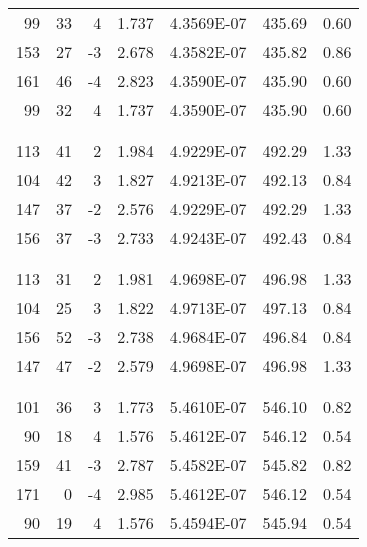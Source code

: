 \documentclass[a4paper,10pt]{article}
\begin{document}
\begin{table}
\begin{tabular}{rrrrrrr}
    99    & 33    & 4     & 1.737 & 4.3569E-07 & 435.69 & 0.60 \\
    153   & 27    & -3    & 2.678 & 4.3582E-07 & 435.82 & 0.86 \\
    161   & 46    & -4    & 2.823 & 4.3590E-07 & 435.90 & 0.60 \\
    99    & 32    & 4     & 1.737 & 4.3590E-07 & 435.90 & 0.60 \\
    \midrule
          &       &       &       &       &       &  \\
    \bottomrule
    \rowcolor[rgb]{ .557,  .663,  .859} \multicolumn{7}{c}{\textcolor[rgb]{ 1,  1,  1}{Verde interno}} \\
    \toprule
    113   & 41    & 2     & 1.984 & 4.9229E-07 & 492.29 & 1.33 \\
    104   & 42    & 3     & 1.827 & 4.9213E-07 & 492.13 & 0.84 \\
    147   & 37    & -2    & 2.576 & 4.9229E-07 & 492.29 & 1.33 \\
    156   & 37    & -3    & 2.733 & 4.9243E-07 & 492.43 & 0.84 \\
    \midrule
          &       &       &       &       &       &  \\
    \bottomrule
    \rowcolor[rgb]{ .557,  .663,  .859} \multicolumn{7}{c}{\textcolor[rgb]{ 1,  1,  1}{Verde esterno}} \\
    \toprule
    113   & 31    & 2     & 1.981 & 4.9698E-07 & 496.98 & 1.33 \\
    104   & 25    & 3     & 1.822 & 4.9713E-07 & 497.13 & 0.84 \\
    156   & 52    & -3    & 2.738 & 4.9684E-07 & 496.84 & 0.84 \\
    147   & 47    & -2    & 2.579 & 4.9698E-07 & 496.98 & 1.33 \\
    \midrule
          &       &       &       &       &       &  \\
    \bottomrule
    \rowcolor[rgb]{ .557,  .663,  .859} \multicolumn{7}{c}{\textcolor[rgb]{ 1,  1,  1}{Verde giallo}} \\
    \toprule
    101   & 36    & 3     & 1.773 & 5.4610E-07 & 546.10 & 0.82 \\
    90    & 18    & 4     & 1.576 & 5.4612E-07 & 546.12 & 0.54 \\
    159   & 41    & -3    & 2.787 & 5.4582E-07 & 545.82 & 0.82 \\
    171   & 0     & -4    & 2.985 & 5.4612E-07 & 546.12 & 0.54 \\
    90    & 19    & 4     & 1.576 & 5.4594E-07 & 545.94 & 0.54 \\

\end{tabular}
\end{table}
\end{document}
